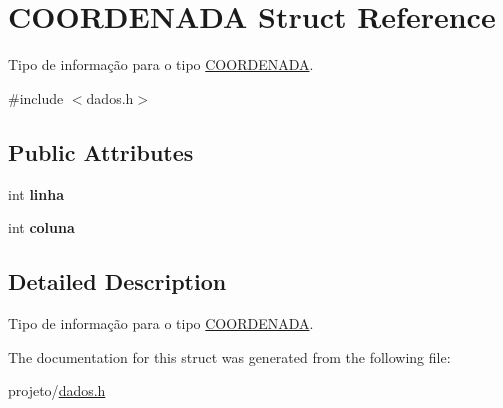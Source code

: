 \hypertarget{structCOORDENADA}{}\section{C\+O\+O\+R\+D\+E\+N\+A\+DA Struct Reference}
\label{structCOORDENADA}


Tipo de informação para o tipo \hyperlink{structCOORDENADA}{C\+O\+O\+R\+D\+E\+N\+A\+DA}.  




{\ttfamily \#include $<$dados.\+h$>$}

\subsection*{Public Attributes}
\begin{DoxyCompactItemize}
\item 
\mbox{\label{structCOORDENADA_aefe14bcc5a066ac3b21500cc3d28c06f}} 
int {\bfseries linha}
\item 
\mbox{\label{structCOORDENADA_adfbc8d4856ce807139fdf62e00aed29a}} 
int {\bfseries coluna}
\end{DoxyCompactItemize}


\subsection{Detailed Description}
Tipo de informação para o tipo \hyperlink{structCOORDENADA}{C\+O\+O\+R\+D\+E\+N\+A\+DA}. 

The documentation for this struct was generated from the following file\+:\begin{DoxyCompactItemize}
\item 
projeto/\hyperlink{dados_8h}{dados.\+h}\end{DoxyCompactItemize}
